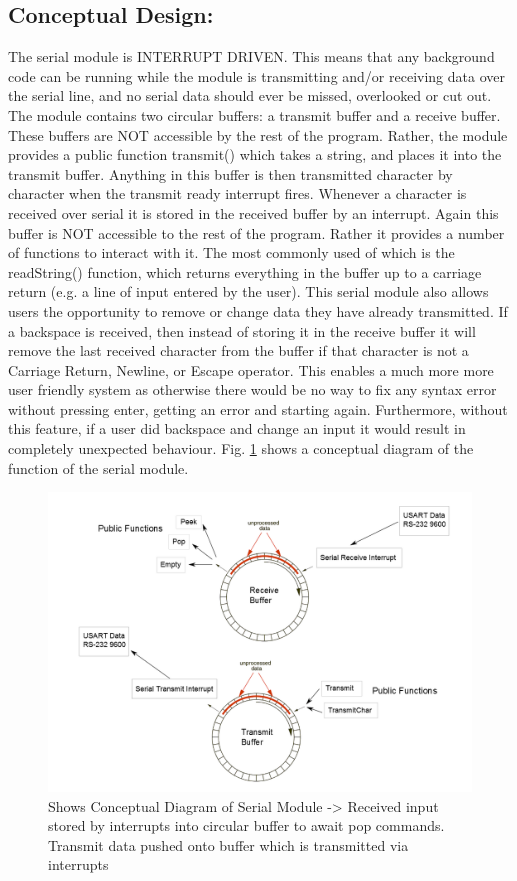 \documentclass[]{report}
\begin{document}
\subsection{Conceptual Design:}
The serial module is INTERRUPT DRIVEN. This means that any background code can be running while the module is transmitting and/or receiving data over the serial line, and no serial data should ever be missed, overlooked or cut out. \newline
The module contains two circular buffers: a transmit buffer and a receive buffer. These buffers are NOT accessible by the rest of the program. Rather, the module provides a public function transmit() which takes a string, and places it into the transmit buffer. Anything in this buffer is then transmitted character by character when the transmit ready interrupt fires. \newline
Whenever a character is received over serial it is stored in the received buffer by an interrupt. Again this buffer is NOT accessible to the rest of the program. Rather it provides a number of functions to interact with it. The most commonly used of which is the readString() function, which returns everything in the buffer up to a carriage return (e.g. a line of input entered by the user). \newline
This serial module also allows users the opportunity to remove or change data they have already transmitted. If a backspace is received, then instead of storing it in the receive buffer it will remove the last received character from the buffer if that character is not a Carriage Return, Newline, or Escape operator. This enables a much more more user friendly system as otherwise there would be no way to fix any syntax error without pressing enter, getting an error and starting again. Furthermore, without this feature, if a user did backspace and change an input it would result in completely unexpected behaviour. \newline
Fig. \ref{fig:SerialModule} shows a conceptual diagram of the function of the serial module.

\begin{figure}
	\centering
	\includegraphics[width=0.7\linewidth]{"../Diagrams/Serial Module"}
	\caption[Serial Module]{Shows Conceptual Diagram of Serial Module -> Received input stored by interrupts into circular buffer to await pop commands. Transmit data pushed onto buffer which is transmitted via interrupts}
	\label{fig:SerialModule}
\end{figure}
\end{document}
